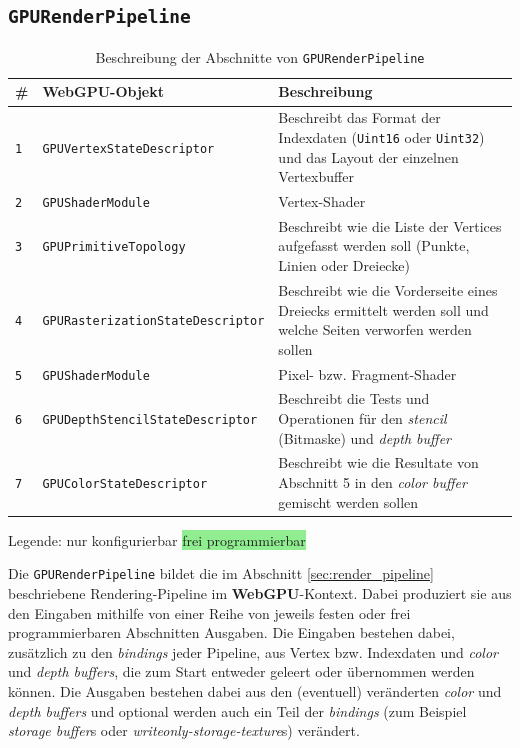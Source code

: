\documentclass[oneside]{ausarbeitung}
\begin{document}
\subsection{\texttt{GPURenderPipeline}}
\begin{table}[htb]
\begin{center}
\begin{tabular}{ |l|l|p{6cm}| }
    \hline
    \textbf{\#} & \textbf{WebGPU-Objekt} & \textbf{Beschreibung} \\
    \hline
    \rowcolor{lightorange}
    \texttt{1} & \texttt{GPUVertexStateDescriptor} & Beschreibt das Format der Indexdaten (\texttt{Uint16} oder \texttt{Uint32}) und das Layout der einzelnen Vertexbuffer  \\
    \hline
    \rowcolor{lightgreen}
    \texttt{2} & \texttt{GPUShaderModule} & Vertex-Shader \\
    \hline
    \rowcolor{lightorange}
    \texttt{3} & \texttt{GPUPrimitiveTopology} & Beschreibt wie die Liste der Vertices aufgefasst werden soll (Punkte, Linien oder Dreiecke) \\
    \hline
    \rowcolor{lightorange}
    \texttt{4} & \texttt{GPURasterizationStateDescriptor} & Beschreibt wie die Vorderseite eines Dreiecks ermittelt werden soll und welche Seiten verworfen werden sollen \\
    \hline
    \rowcolor{lightgreen}
    \texttt{5} & \texttt{GPUShaderModule} & Pixel- bzw. Fragment-Shader \\
    \hline
    \rowcolor{lightorange}
    \texttt{6} & \texttt{GPUDepthStencilStateDescriptor} & Beschreibt die Tests und Operationen für den \textit{stencil} (Bitmaske) und \textit{depth buffer} \\
    \hline
    \rowcolor{lightorange}
    \texttt{7} & \texttt{GPUColorStateDescriptor} & Beschreibt wie die Resultate von Abschnitt 5 in den \textit{color buffer} gemischt werden sollen \\
    \hline
\end{tabular}
\end{center}
Legende: \colorbox{lightorange}{nur konfigurierbar} \colorbox{lightgreen}{frei programmierbar}
\caption{Beschreibung der Abschnitte von \texttt{GPURenderPipeline}}
\label{tab:render_pipeline_stages}
\end{table}

Die \texttt{GPURenderPipeline} bildet die im Abschnitt \ref{sec:render_pipeline} beschriebene Rendering-Pipeline im \textbf{WebGPU}-Kontext. Dabei produziert sie aus den Eingaben mithilfe von einer Reihe von jeweils festen oder frei programmierbaren Abschnitten Ausgaben. Die Eingaben bestehen dabei, zusätzlich zu den \textit{bindings} jeder Pipeline, aus Vertex bzw. Indexdaten und \textit{color} und \textit{depth buffers}, die zum Start entweder geleert oder übernommen werden können. Die Ausgaben bestehen dabei aus den (eventuell) veränderten \textit{color} und \textit{depth buffers} und optional werden auch ein Teil der \textit{bindings} (zum Beispiel \textit{storage buffer}s oder \textit{writeonly-storage-texture}s) verändert.
\end{document}

